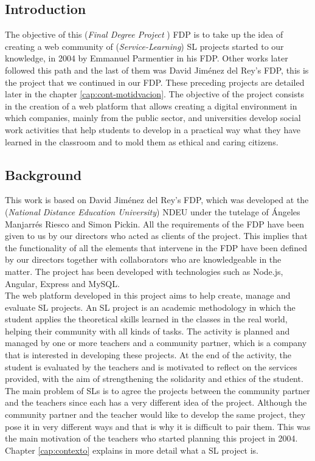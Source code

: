 \documentclass[11pt]{book}
\begin{document}
\begin{itemize}
\chapter{Introduction}
The objective of this (\textit{Final Degree Project} ) FDP is to take up the idea of creating a web community of (\emph{Service-Learning}) SL projects started to our knowledge, in 2004 by Emmanuel Parmentier in his FDP. Other works later followed this path and the last of them was David Jiménez del Rey's FDP, this is the project that we continued in our FDP. These preceding projects are detailed later in the chapter \ref{cap:cont-motidvacion}. The objective of the project consists in the creation of a web platform that allows creating a digital environment in which companies, mainly from the public sector, and universities develop social work activities that help students to develop in a practical way what they have learned in the classroom and to mold them as ethical and caring citizens.

\section{Background}
This work is based on David Jiménez del Rey's FDP, which was developed at the (\emph{National Distance Education University}) NDEU under the tutelage of Ángeles Manjarrés Riesco and Simon Pickin. All the requirements of the FDP have been given to us by our directors who acted as clients of the project. This implies that the functionality of all the elements that intervene in the FDP have been defined by our directors together with collaborators who are knowledgeable in the matter. The project has been developed with technologies such as Node.js, Angular, Express and MySQL. \\
The web platform developed in this project aims to help create, manage and evaluate SL projects. An SL project is an academic methodology in which the student applies the theoretical skills learned in the classes in the real world, helping their community with all kinds of tasks. The activity is planned and managed by one or more teachers and a community partner, which is a company that is interested in developing these projects. At the end of the activity, the student is evaluated by the teachers and is motivated to reflect on the services provided, with the aim of strengthening the solidarity and ethics of the student. \\
The main problem of SLs is to agree the projects between the community partner and the teachers since each has a very different idea of the project. Although the community partner and the teacher would like to develop the same project, they pose it in very different ways and that is why it is difficult to pair them. This was the main motivation of the teachers who started planning this project in 2004. Chapter \ref{cap:contexto} explains in more detail what a SL project is. \\


\end{itemize}
\end{document}
